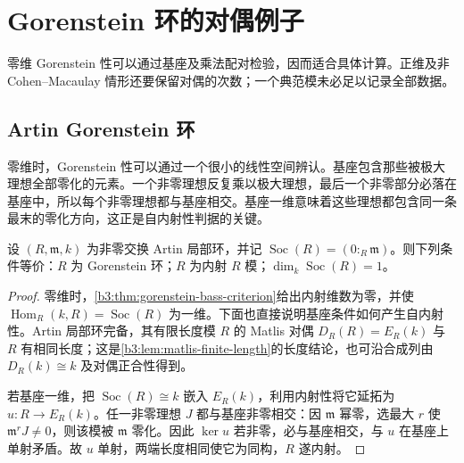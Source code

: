 
\section{Gorenstein 环的对偶例子}
\label{b3:sec:2204}

零维 Gorenstein 性可以通过基座及乘法配对检验，因而适合具体计算。正维及非 Cohen–Macaulay 情形还要保留对偶的次数；一个典范模未必足以记录全部数据。


%
%
%

\subsection{Artin Gorenstein 环}
\label{b3:subsec:2204:01}

零维时，Gorenstein 性可以通过一个很小的线性空间辨认。基座包含那些被极大理想全部零化的元素。一个非零理想反复乘以极大理想，最后一个非零部分必落在基座中，所以每个非零理想都与基座相交。基座一维意味着这些理想都包含同一条最末的零化方向，这正是自内射性判据的关键。

\begin{proposition}\label{b3:prop:artinian-gorenstein-socle}
	设 \((R,\mathfrak m,k)\) 为非零交换 Artin 局部环，并记 \(\operatorname{Soc}(R)=(0:_R\mathfrak m)\)。则下列条件等价：\(R\) 为 Gorenstein 环；\(R\) 为内射 \(R\) 模；\(\dim_k\operatorname{Soc}(R)=1\)。
\end{proposition}
\begin{proof}
	零维时，\cref{b3:thm:gorenstein-bass-criterion}给出内射维数为零，并使 \(\operatorname{Hom}_R(k,R)=\operatorname{Soc}(R)\) 为一维。下面也直接说明基座条件如何产生自内射性。Artin 局部环完备，其有限长度模 \(R\) 的 Matlis 对偶 \(D_R(R)=E_R(k)\) 与 \(R\) 有相同长度；这是\cref{b3:lem:matlis-finite-length}的长度结论，也可沿合成列由 \(D_R(k)\cong k\) 及对偶正合性得到。

	若基座一维，把 \(\operatorname{Soc}(R)\cong k\) 嵌入 \(E_R(k)\)，利用内射性将它延拓为 \(u:R\to E_R(k)\)。任一非零理想 \(J\) 都与基座非零相交：因 \(\mathfrak m\) 幂零，选最大 \(r\) 使 \(\mathfrak m^rJ\ne0\)，则该模被 \(\mathfrak m\) 零化。因此 \(\ker u\) 若非零，必与基座相交，与 \(u\) 在基座上单射矛盾。故 \(u\) 单射，两端长度相同使它为同构，\(R\) 遂内射。
\end{proof}

